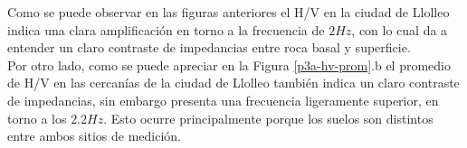 Como se puede observar en las figuras anteriores el H/V en la ciudad de Llolleo indica una clara amplificación en torno a la frecuencia de $2Hz$, con lo cual da a entender un claro contraste de impedancias entre roca basal y superficie. \\

Por otro lado, como se puede apreciar en la Figura \ref{p3a-hv-prom}.b el promedio de H/V en las cercanías de la ciudad de Llolleo también indica un claro contraste de impedancias, sin embargo presenta una frecuencia ligeramente superior, en torno a los $2.2Hz$. Esto ocurre principalmente porque los suelos son distintos entre ambos sitios de medición.